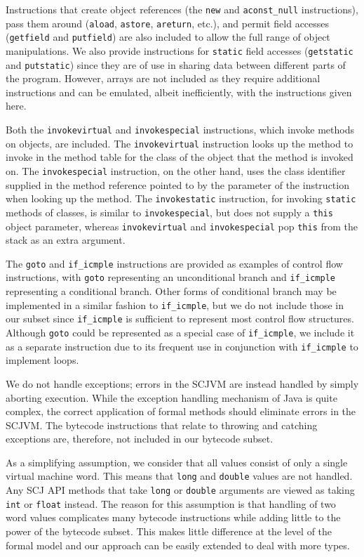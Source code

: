 Instructions that create object references (the \texttt{new} and
\texttt{aconst\_null} instructions), pass them around (\texttt{aload},
\texttt{astore}, \texttt{areturn}, etc.), and permit
field accesses (\texttt{getfield} and \texttt{putfield}) are also
included to allow the full range of object manipulations.
We also provide instructions for \texttt{static} field accesses
(\texttt{getstatic} and \texttt{putstatic}) since they are of use in
sharing data between different parts of the program.
However, arrays are not included as they require additional
instructions and can be emulated, albeit inefficiently, with the
instructions given here.

Both the \texttt{invokevirtual} and \texttt{invokespecial}
instructions, which invoke methods on objects, are included.
The \texttt{invokevirtual} instruction looks up the method to invoke
in the method table for the class of the object that the method is
invoked on.
The \texttt{invokespecial} instruction, on the other hand, uses the
class identifier supplied in the method reference pointed to by the
parameter of the instruction when looking up the method.
The \texttt{invokestatic} instruction, for invoking \texttt{static}
methods of classes, is similar to \texttt{invokespecial}, but does not
supply a \texttt{this} object parameter, whereas
\texttt{invokevirtual} and \texttt{invokespecial} pop \texttt{this}
from the stack as an extra argument.

The \texttt{goto} and \texttt{if\_icmple} instructions are provided as
examples of control flow instructions, with \texttt{goto} representing
an unconditional branch and \texttt{if\_icmple} representing a
conditional branch.
Other forms of conditional branch may be implemented in a similar
fashion to \texttt{if\_icmple}, but we do not include those in our
subset since \texttt{if\_icmple} is sufficient to represent most
control flow structures.
Although \texttt{goto} could be represented as a special case of
\texttt{if\_icmple}, we include it as a separate instruction due to
its frequent use in conjunction with \texttt{if\_icmple} to implement
loops.

We do not handle exceptions; errors in the SCJVM are instead handled
by simply aborting execution.
While the exception handling mechanism of Java is quite complex, the
correct application of formal methods should eliminate errors in the
SCJVM.
The bytecode instructions that relate to throwing and catching
exceptions are, therefore, not included in our bytecode subset.

As a simplifying assumption, we consider that all values consist of
only a single virtual machine word.
This means that \texttt{long} and \texttt{double} values are not
handled.
Any SCJ API methods that take \texttt{long} or \texttt{double}
arguments are viewed as taking \texttt{int} or \texttt{float} instead.
The reason for this assumption is that handling of two word values
complicates many bytecode instructions while adding little to the
power of the bytecode subset.
This makes little difference at the level of the formal model and our
approach can be easily extended to deal with more types.

